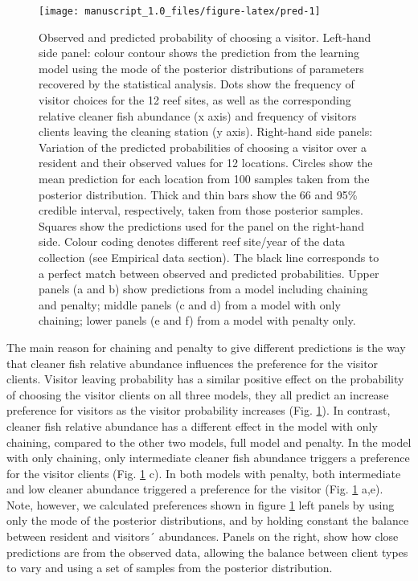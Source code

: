 \documentclass[]{rsos}%
\begin{document}
\begin{figure}

{\centering \texttt{[image: manuscript\_1.0\_files/figure-latex/pred-1]} 

}

\caption{Observed and predicted probability of choosing a visitor.
Left-hand side panel: colour contour shows the prediction from the
learning model using the mode of the posterior distributions of parameters
recovered by the statistical analysis. Dots show the frequency of visitor
choices for the 12 reef sites, as well as the corresponding relative
cleaner fish abundance (x axis) and frequency of visitors clients leaving
the cleaning station (y axis). Right-hand side panels: Variation of the
predicted probabilities of choosing a visitor over a resident and their
observed values for 12 locations. Circles show the mean prediction for
each location from 100 samples taken from the posterior distribution.
Thick and thin bars show the 66 and 95\% credible interval, respectively,
taken from those posterior samples. Squares show the predictions used for the
panel on the right-hand side. Colour coding denotes different reef site/year
of the data collection (see Empirical data section). The black line corresponds
to a perfect match between observed and predicted probabilities. Upper
panels (a and b) show predictions from a model including chaining and
penalty; middle panels (c and d) from a model with only chaining; lower
panels (e and f) from a model with penalty only.}\label{fig:pred}
\end{figure}

The main reason for chaining and penalty to give different
predictions is the way that cleaner fish relative abundance influences the
preference for the visitor clients. Visitor leaving probability has a
similar positive effect on the probability of choosing the visitor
clients on all three models, they all predict an increase preference
for visitors as the visitor probability increases (Fig. \ref{fig:pred}).
In contrast, cleaner fish relative abundance has a different effect in the
model with only chaining, compared to the other two models,
full model and penalty. In the model with only chaining, only intermediate
cleaner fish abundance triggers a preference for the visitor
clients (Fig. \ref{fig:pred} c). In both models with penalty,
both intermediate and low cleaner abundance triggered a preference
for the visitor (Fig. \ref{fig:pred} a,e). Note, however, we calculated
preferences shown in figure \ref{fig:pred} left panels by using only the mode
of the posterior distributions, and by holding constant the balance between
resident and visitors´ abundances. Panels on the right, show how close
predictions are from the observed data, allowing the balance between
client types to vary and using a set of samples from the posterior
distribution.
\end{document}
